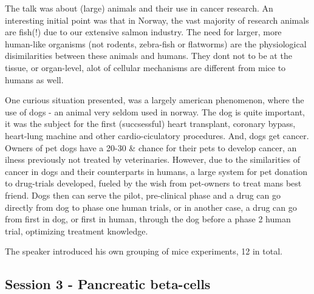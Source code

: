 \documentclass[12p]{article}
\begin{document}
The talk was about (large) animals and their use in cancer research.
An interesting initial point was that in Norway, the vast majority of research animals are fish(!) due to our extensive salmon industry.
The need for larger, more human-like organisms (not rodents, zebra-fish or flatworms) are the physiological disimilarities between these animals and humans.
They dont not to be at the tissue, or organ-level, alot of cellular mechanisms are different from mice to humans as well.

One curious situation presented, was a largely american phenomenon, where the use of dogs - an animal very seldom used in norway.
The dog is quite important, it was the subject for the first (succsessful) heart transplant, coronary bypass, heart-lung machine and other cardio-ciculatory procedures.
And, dogs get cancer.
Owners of pet dogs have a 20-30 \& chance for their pets to develop cancer, an ilness previously not treated by veterinaries.
However, due to the similarities of cancer in dogs and their counterparts in humans, a large system for pet donation to drug-trials developed, fueled by the wish from pet-owners to treat mans best friend.
Dogs then can serve the pilot, pre-clinical phase and a drug can go directly from dog to phase one human trials, or in another case, a drug can go from first in dog, or first in human, through the dog before a phase 2 human trial, optimizing treatment knowledge.

The speaker introduced his own grouping of mice experiments, 12 in total.

\subsection*{Session 3 - Pancreatic beta-cells}
\end{document}
